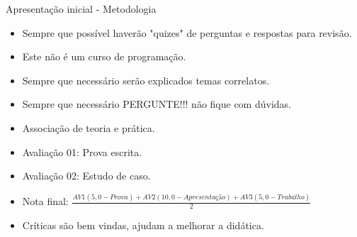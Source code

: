 
\begin{frame}{Apresentação inicial - Metodologia}
    \begin{itemize}
        \item Sempre que possível haverão "quizes" de perguntas e respostas para revisão.
        \item Este não é um curso de programação.
        \item Sempre que necessário serão explicados temas correlatos.
        \item Sempre que necessário PERGUNTE!!! não fique com dúvidas.
        \item Associação de teoria e prática.
        \item Avaliação 01: Prova escrita.
        \item Avaliação 02: Estudo de caso.
        \item Nota final: $\frac{AV1 (5,0 - Prova)  + AV2 (10,0 - Apresentação) + AV3 (5,0 - Trabalho)}{2}$
        \item Críticas são bem vindas, ajudam a melhorar a didática.
    \end{itemize}
\end{frame}